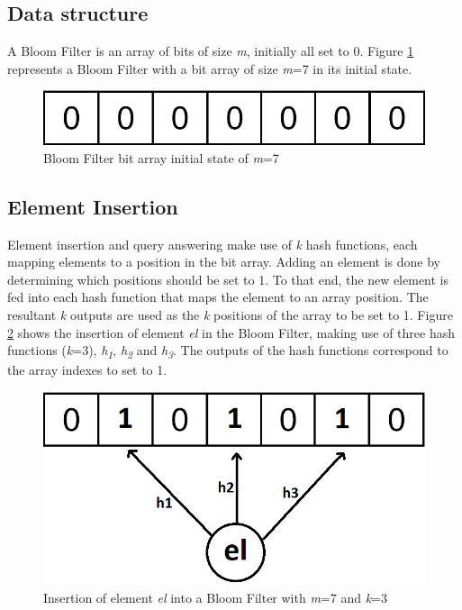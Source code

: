 \subsection*{Data structure}
A Bloom Filter is an array of bits of size \textit{m}, initially all set to 0. Figure \ref{fig:initial-bloom-filter} represents a Bloom Filter with a bit array of size \textit{m}=7 in its initial state.

\begin{figure}[!htb]
    \begin{center}
      \includegraphics[scale=0.9]{figures/initial-bloom.png}
      \caption[Bloom Filter initial state]{Bloom Filter bit array initial state of \textit{m}=7}
      \label{fig:initial-bloom-filter}
    \end{center}
\end{figure}

\subsection*{Element Insertion}
Element insertion and query answering make use of \textit{k} hash functions, each mapping elements to a position in the bit array. Adding an element is done by determining which positions should be set to 1. To that end, the new element is fed into each hash function that maps the element to an array position. The resultant \textit{k} outputs are used as the \textit{k} positions of the array to be set to 1. Figure \ref{fig:insertion-bloom-filter} shows the insertion of element \textit{el} in the Bloom Filter, making use of three hash functions (\textit{k}=3), \textit{h\textsubscript{1}}, \textit{h\textsubscript{2}} and \textit{h\textsubscript{3}}. The outputs of the hash functions correspond to the array indexes to set to 1.

\begin{figure}[!htb]
    \begin{center}
      \includegraphics[scale=0.3]{figures/insert-bloom.png}
      \caption[Bloom Filter insertion]{Insertion of element \textit{el} into a Bloom Filter with \textit{m}=7 and \textit{k}=3}
      \label{fig:insertion-bloom-filter}
    \end{center}
\end{figure}

